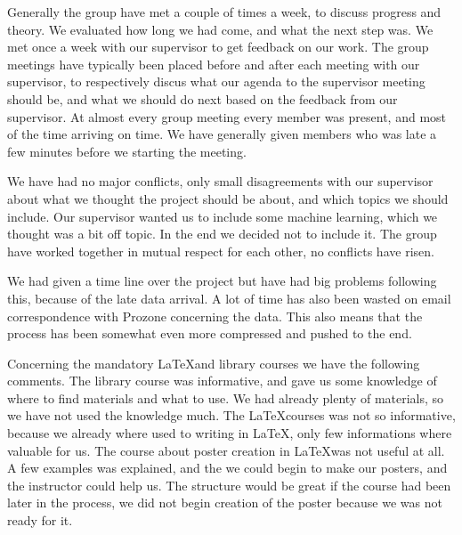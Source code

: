\documentclass[Report.tex]{subfiles}
\begin{document}
Generally the group have met a couple of times a week, to discuss progress and theory. We evaluated how long we had come, and what the next step was. We met once a week with our supervisor to get feedback on our work. The group meetings have typically been placed before and after each meeting with our supervisor, to respectively discus what our agenda to the supervisor meeting should be, and what we should do next based on the feedback from our supervisor. At almost every group meeting every member was present, and most of the time arriving on time. We have generally given members who was late a few minutes before we starting the meeting. 

We have had no major conflicts, only small disagreements with our supervisor about what we thought the project should be about, and which topics we should include. Our supervisor wanted us to include some machine learning, which we thought was a bit off topic. In the end we decided not to include it. The group have worked together in mutual respect for each other, no conflicts have risen.

We had given a time line over the project but have had big problems following this, because of the late data arrival. A lot of time has also been wasted on email correspondence with Prozone concerning the data. This also means that the process has been somewhat even more compressed and pushed to the end. 

Concerning the mandatory \LaTeX\space and library courses we have the following comments. The library course was informative, and gave us some knowledge of where to find materials and what to use. We had already plenty of materials, so we have not used the knowledge much. The \LaTeX \space courses was not so informative, because we already where used to writing in \LaTeX, only few informations where valuable for us. The course about poster creation in \LaTeX\space was not useful at all. A few examples was explained, and the we could begin to make our posters, and the instructor could help us. The structure would be great if the course had been later in the process, we did not begin creation of the poster because we was not ready for it.
\end{document}
